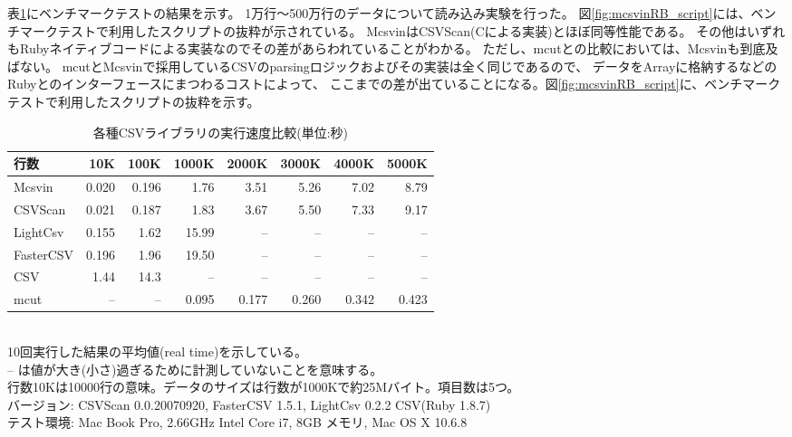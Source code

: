 表\ref{tb:mcsvinRB_bench1}にベンチマークテストの結果を示す。
1万行〜500万行のデータについて読み込み実験を行った。
図\ref{fig:mcsvinRB_script}には、ベンチマークテストで利用したスクリプトの抜粋が示されている。
McsvinはCSVScan(Cによる実装)とほぼ同等性能である。
その他はいずれもRubyネイティブコードによる実装なのでその差があらわれていることがわかる。
ただし、mcutとの比較においては、Mcsvinも到底及ばない。
mcutとMcsvinで採用しているCSVのparsingロジックおよびその実装は全く同じであるので、
データをArrayに格納するなどのRubyとのインターフェースにまつわるコストによって、
ここまでの差が出ていることになる。図\ref{fig:mcsvinRB_script}に、ベンチマークテストで利用したスクリプトの抜粋を示す。
\begin{table}[htpb]
\begin{center}
\caption{各種CSVライブラリの実行速度比較(単位:秒)\label{tb:mcsvinRB_bench1}}
\begin{tabular}{l|r|r|r|r|r|r|r}
\hline
行数      & 10K   & 100K  & 1000K & 2000K& 3000K & 4000K & 5000K\\ \hline
Mcsvin    & 0.020 & 0.196 & 1.76  & 3.51 & 5.26  & 7.02  & 8.79 \\
CSVScan   & 0.021 & 0.187 & 1.83  & 3.67 & 5.50  & 7.33  & 9.17 \\
LightCsv  & 0.155 & 1.62  & 15.99 & --   &    -- & --    & --   \\
FasterCSV & 0.196 & 1.96  & 19.50 & --   &    -- & --    & --   \\
CSV       & 1.44  & 14.3  &  --   & --   &    -- & --    & --   \\
mcut      & --    & --    & 0.095 & 0.177& 0.260 & 0.342 & 0.423\\
\hline
\end{tabular}  
{\small
\\10回実行した結果の平均値(real time)を示している。\\
-- は値が大き(小さ)過ぎるために計測していないことを意味する。\\
行数10Kは10000行の意味。データのサイズは行数が1000Kで約25Mバイト。項目数は5つ。\\
バージョン: CSVScan 0.0.20070920, FasterCSV 1.5.1, LightCsv 0.2.2  CSV(Ruby 1.8.7)\\
テスト環境: Mac Book Pro, 2.66GHz Intel Core i7, 8GB メモリ, Mac OS X 10.6.8
}
\end{center}
\end{table}  


